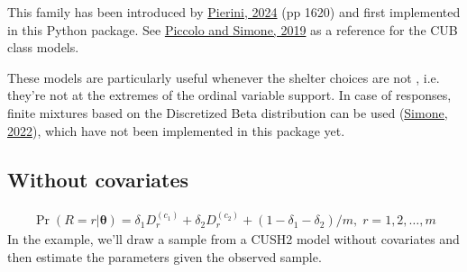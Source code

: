 \documentclass[letterpaper,10pt,english]{sphinxmanual}
\begin{document}
\sphinxAtStartPar
This family has been introduced by \hyperlink{cite.references:id41}{Pierini, 2024} (pp 16\sphinxhyphen{}20) and first
implemented in this Python package. See \hyperlink{cite.references:id3}{Piccolo and Simone, 2019} as a reference
for the CUB class models.

\sphinxAtStartPar
These models are particularly useful whenever the shelter choices are not
, i.e. they’re not at the extremes of the ordinal variable support.
In case of  responses,
finite mixtures based on the Discretized Beta distribution can be
used (\hyperlink{cite.references:id12}{Simone, 2022}), which have not been implemented in this package yet.


\subsection{Without covariates}
\label{\detokenize{manual:cush2-without-covariates}}\label{\detokenize{manual:id27}}
\sphinxAtStartPar
{}
\begin{equation*}
\begin{split}\Pr(R=r|\pmb\theta) = \delta_1 D_r^{(c_1)} + \delta_2 D_r^{(c_2)} + (1-\delta_1-\delta_2)/m
,\; r=1,2,\ldots,m\end{split}
\end{equation*}
\sphinxAtStartPar
In the example, we’ll draw a sample from a CUSH2 model without covariates and
then estimate the parameters given the observed sample.
\end{document}
